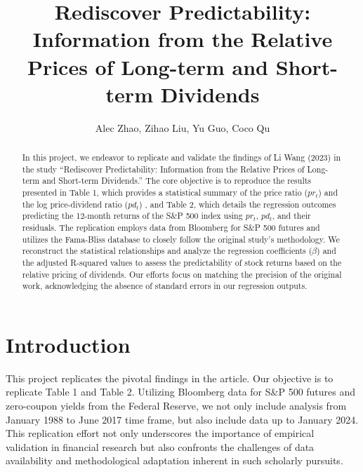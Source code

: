 \documentclass{article}
\title{Rediscover Predictability: Information from the Relative Prices of Long-term and Short-term Dividends}
\author{Alec Zhao, Zihao Liu, Yu Guo, Coco Qu}
\begin{document}
\maketitle

\begin{abstract}\noindent
In this project, we endeavor to replicate and validate the 
findings of Li Wang (2023) in the study ``Rediscover Predictability: 
Information from the Relative Prices of Long-term and Short-term 
Dividends.'' The core objective is to reproduce the results 
presented in Table 1, which provides a statistical summary of the 
price ratio (\( pr_t \)) and the log price-dividend ratio (\( pd_t \))
, and Table 2, which details the regression outcomes predicting the 
12-month returns of the S\&P 500 index using \( pr_t \), \( pd_t \), 
and their residuals.
\newline
\newline
The replication employs data from Bloomberg for S\&P 500 futures and 
utilizes the Fama-Bliss database to closely follow the original study's 
methodology. We reconstruct the statistical relationships and analyze 
the regression coefficients (\( \beta \)) and the adjusted R-squared 
values to assess the predictability of stock returns based on the 
relative pricing of dividends. Our efforts focus on matching the 
precision of the original work, acknowledging the absence of standard
 errors in our regression outputs.
\end{abstract}

\section{Introduction}
This project replicates the pivotal findings in the article. Our 
objective is to replicate Table 1 and Table 2. Utilizing Bloomberg 
data for S\&P 500 futures and zero-coupon yields from the Federal 
Reserve, we not only include analysis from January 1988 to June 
2017 time frame, but also include data up to January 2024. This 
replication effort not only underscores the importance of empirical 
validation in financial research but also confronts the challenges 
of data availability and methodological adaptation inherent in such 
scholarly pursuits.
\end{document}
